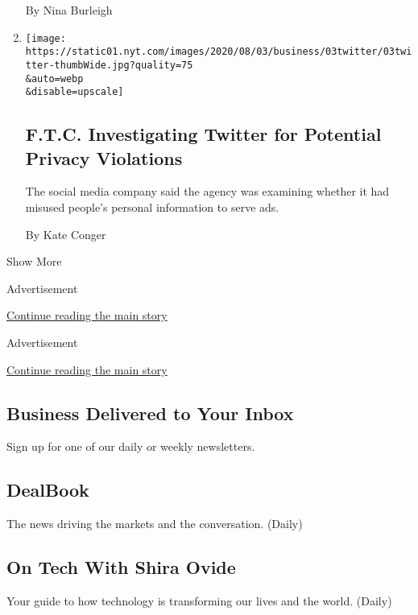 \begin{enumerate}
  By Nina Burleigh
\item
  \href{/2020/08/03/technology/ftc-twitter-privacy-violations.html}{}

  \texttt{[image: https://static01.nyt.com/images/2020/08/03/business/03twitter/03twitter-thumbWide.jpg?quality=75\\\&auto=webp\\\&disable=upscale]}

  \hypertarget{ftc-investigating-twitter-for-potential-privacy-violations}{%
  \subsection{F.T.C. Investigating Twitter for Potential Privacy
  Violations}\label{ftc-investigating-twitter-for-potential-privacy-violations}}

  The social media company said the agency was examining whether it had
  misused people's personal information to serve ads.

  By Kate Conger
\end{enumerate}

Show More

Advertisement

\protect\hyperlink{after-mid2}{Continue reading the main story}

Advertisement

\protect\hyperlink{after-mktg}{Continue reading the main story}

\hypertarget{business-delivered-to-your-inbox}{%
\subsection{Business Delivered to Your
Inbox}\label{business-delivered-to-your-inbox}}

Sign up for one of our daily or weekly newsletters.

\hypertarget{dealbook}{%
\subsection{DealBook}\label{dealbook}}

The news driving the markets and the conversation. (Daily)

\hypertarget{on-tech-with-shira-ovide}{%
\subsection{On Tech With Shira Ovide}\label{on-tech-with-shira-ovide}}

Your guide to how technology is transforming our lives and the world.
(Daily)


